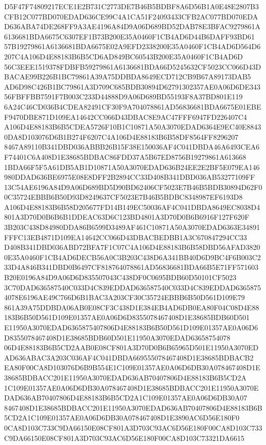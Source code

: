 \documentclass[UTF8,fontset=fandol,zihao=-4,a4paper]{ctexart}
\begin{document}
{{D5F47F74809217ECE1E2B731C2773DE7B46B5BDBF8A6D56B1A0E48E2807B3CFB12C077BD070EDAD636CE99C4A1CA51F24093433CFB2AC077BD070EDA
D636ABA74DE268FF9A3AE4196A84D9A06D689BD52DAB78E3BFAC9279861A6136681BDA6675C6307EF1B73B200E35A0460F1CB4AD6D44B6DAFF93BD61
57B19279861A6136681BDA6675E02A9EFD2338200E35A0460F1CB4AD6D564D6207C4A106D4E88183B6B5CD6AD849BC60543B200E35A0460F1CB4AD6D
56C3EEE1519378FDBFB59279861A6136681BDA66D5245632CF5023CC066D43DBACAE99B226B1BC79861A39A75DDBDA8649ECD712CB9B67A89173DAB5
AD6D98C426B1BC79861A3D709C685BDB30894D62791302357AE0A06D6DE34356FBFFBB7591F7B003C233D44888D9A06D689BD55193F8A37BD801E119
6A24C46CD036B4CDEA82491CF30F9A704078861AD56836681BDA6675E01EBEF9470DBE871D109EA14642CC066D43DBAC8E9AC47FFF6947FD226407C4
A106D4E88183B6B5CDEA5726F10B1C10871A50A3070EDAD6364E9EC40E88430DA8D103076D6B1B274F6207C4A106D4E88183B6B58DF8564FF8296207
8467A89110B341DBD036ABBB26B15F38E150036AF4C041DBDA46A6493CEA6F74401C6A408D1E38685BDBAC86FDD37A5B67ED8756B19279861A613668
1BDA66F5F5A61DB5AB1D10871A50A3070EDAD636B24EE2E2BF5E079EA146980DDAD636BE6975E08E8DFF2B2894CC33D408B341DBD036AB53277109FF
13C54AE6196A84D9A06D689BD5D90BD62406CF5023E7B46B5BDB30894D62F00C35724EBBB6B50D93D8249637CF5023E7B46B5BDBC8348987EF6193D8
A106D4E88183B6B58D205677FD14B149EC50036AF4C041DBDA8649EC8038D4801A3D70D0B6B6B1DDEAC63D6C123BD4801A3D70D0B6B6916F127F620F
3B203C438D84980DDA86B6599D3489AF461C10871A50A3070EDAD6363E34891FFFC13EB4871D109EA14642CC066D43DBACBEDBB1A3C670847294CC33
D408B341DBD036ABD72BFA7F1C07C4A106D4E88183B6B58DBD56AFAD38200E35A0460F1CB4AD6DECB56A0C3B203C438D6A341BB40D6D9BC4F6B003C2
33D4A846B341DBD0B6497CF818764078861AD56836681BDA66B5E71FF571603B20E0196A84D9A06D6D835507043C438DF0C0695BDB60D50101CF5023
3C70DAD636587540C033D4C839EDDAD636587540C033D4C839EDDAD63658754078E6196AE49C766D6B1BAC3A203CF30C35724EBBB6B50D561D109E79
861A39A75DDBDA06AB0E08CF3C438D1E384EB4AD6DB0EA80F04C08D4E88183B6B50D561D109E01357AE0A06D6D8355078467408D1E38685BDB60D501
E11950A3070EDAD6365875407806D4E88183B6B50D561D109E01357AE0A06D6D8355078467408D1E38685BDB60D501E11950A3070EDAD63658754078
06D4E88183B6B5CD2AAB0E08CF801A3D70D0B6B65965D501E11950A3070EDAD636ABAC3A203C036AF4C041DBDA669555078467408D1E38685BDBACB2
EA80F00CA8D103076D6B9B554E1C109E01357AE0A06D6DB30A078467408D1E38685BDBACC201E11950A3070EDAD636AB70407806D4E88183B6B5CD2A
1C109E01357AE0A06D6DB30A078467408D1E38685BDBACC201E11950A3070EDAD636AB70407806D4E88183B6B5CD2A1C109E01357AE0A06D6DB30A07
8467408D1E38685BDBACC201E11950A3070EDAD636AB70407806D4E88183B6B5CD2A1C109E01357AE0A06D6DB30A078467408D1E3890AC6D56E180F0
0CA8D103C733C9DA66150E08CF801A3D703C93AC6D56E180F00CA8D103C733C9DA66150E08CF801A3D703C93AC6D56E180F00CA8D103C73321DA6615
}}
\end{document}
